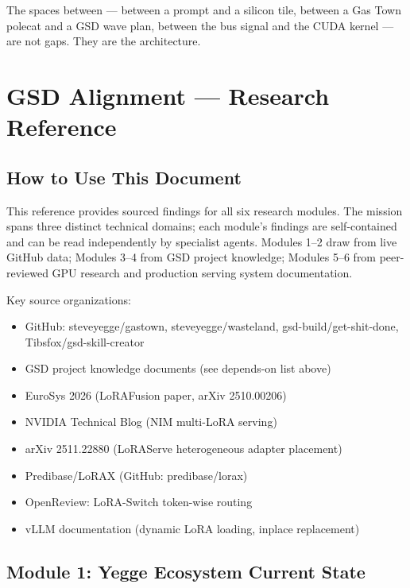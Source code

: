 \documentclass[11pt,letterpaper]{article}
\newcommand{\stageheader}[2]{%
  \noindent\colorbox{#2}{\makebox[\textwidth][l]{%
    \textcolor{white}{\bfseries\sffamily\hspace{6pt}#1\hspace{6pt}}}}%
  \vspace{0.5em}\par%
}
\begin{document}
The spaces between --- between a prompt and a silicon tile, between a Gas Town polecat and a GSD wave plan, between the bus signal and the CUDA kernel --- are not gaps. They are the architecture.

\newpage

\stageheader{STAGE 2 --- RESEARCH REFERENCE}{secondary}

\section{GSD Alignment --- Research Reference}

\subsection{How to Use This Document}

This reference provides sourced findings for all six research modules. The mission spans three distinct technical domains; each module's findings are self-contained and can be read independently by specialist agents. Modules 1--2 draw from live GitHub data; Modules 3--4 from GSD project knowledge; Modules 5--6 from peer-reviewed GPU research and production serving system documentation.

Key source organizations:
\begin{itemize}
  \item GitHub: steveyegge/gastown, steveyegge/wasteland, gsd-build/get-shit-done, Tibsfox/gsd-skill-creator
  \item GSD project knowledge documents (see depends-on list above)
  \item EuroSys 2026 (LoRAFusion paper, arXiv 2510.00206)
  \item NVIDIA Technical Blog (NIM multi-LoRA serving)
  \item arXiv 2511.22880 (LoRAServe heterogeneous adapter placement)
  \item Predibase/LoRAX (GitHub: predibase/lorax)
  \item OpenReview: LoRA-Switch token-wise routing
  \item vLLM documentation (dynamic LoRA loading, inplace replacement)
\end{itemize}

\subsection{Module 1: Yegge Ecosystem Current State}
\end{document}
